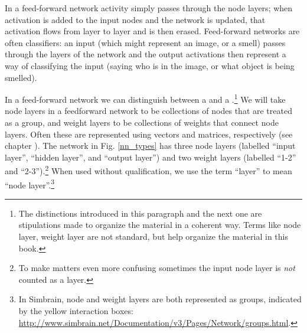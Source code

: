  In a feed-forward network activity simply passes through the node layers; when activation is added to the input nodes and the network is updated, that activation flows from layer to layer and is then erased. Feed-forward networks are often classifiers: an input (which might represent an image, or a smell) passes through the layers of the network and the output activations then represent a way of classifying the input (saying who is in the image, or what object is being smelled).

In a feed-forward network we can distinguish between a  and a .\footnote{The distinctions introduced in this paragraph and the next one are stipulations made to organize the material in a coherent way. Terms like node layer, weight layer are not standard, but help organize the material in this book.}  We will take node layers in a feedforward network to be collections of nodes that are treated as a group, and weight layers to be collections of weights that connect node layers. Often these are represented using vectors and matrices, respectively (see chapter ). The network in Fig. \ref{nn_types} has three node layers (labelled ``input layer'', ``hidden layer'', and ``output layer'') and two weight layers (labelled ``1-2'' and ``2-3'').\footnote{To make matters even more confusing sometimes the input node layer is \emph{not} counted as a layer.} When used without qualification, we use the term ``layer'' to mean ``node layer''.\footnote{In Simbrain, node and weight layers are both represented as groups, indicated by the yellow interaction boxes: \url{http://www.simbrain.net/Documentation/v3/Pages/Network/groups.html}.}

